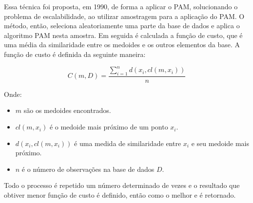 \documentclass[12pt,a4paper,header]{abnt}
\begin{document}
Essa técnica foi proposta, em 1990, de forma a aplicar o PAM, solucionando o problema de escalabilidade, ao utilizar amostragem para a aplicação do PAM\cite{park2009simple}. O método, então, seleciona aleatoriamente uma parte da base de dados e aplica o algoritmo PAM nesta amostra. Em seguida é calculada a função de custo, que é uma média da similaridade entre os medoides e os outros elementos da base\cite{bhat2014k}. A função de custo é definida da seguinte maneira:

\begin{equation}
C(m, D) = \frac{\sum_{i=1}^{n}{d(x_i, cl(m, x_i))}}{n}
\end{equation}

Onde:

\begin{itemize}

\item{$m$ são os medoides encontrados.}
\item{$cl(m,  x_i)$ é o medoide mais próximo de um ponto $x_i$.}
\item{$d(x_i, cl(m, x_i))$ é uma medida de similaridade entre $x_i$ e seu medoide mais próximo.}
\item{$n$ é o número de observações na base de dados $D$.}

\end{itemize}

Todo o processo é repetido um número determinado de vezes e o resultado que obtiver menor função de custo é definido, então como o melhor e é retornado\cite{bhat2014k}.


% 
% 
% 
% 
% 
% 
% 
% 
\end{document}
